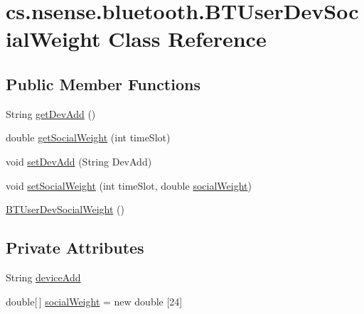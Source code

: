 \hypertarget{classcs_1_1nsense_1_1bluetooth_1_1_b_t_user_dev_social_weight}{\section{cs.\-nsense.\-bluetooth.\-B\-T\-User\-Dev\-Social\-Weight Class Reference}
\label{classcs_1_1nsense_1_1bluetooth_1_1_b_t_user_dev_social_weight}
}
\subsection*{Public Member Functions}
\begin{DoxyCompactItemize}
\item 
String \hyperlink{classcs_1_1nsense_1_1bluetooth_1_1_b_t_user_dev_social_weight_a4a86b07a5c005c4651f491f789ba6bd1}{get\-Dev\-Add} ()
\item 
double \hyperlink{classcs_1_1nsense_1_1bluetooth_1_1_b_t_user_dev_social_weight_af090ed06b103993fa00d23129dc3b3e6}{get\-Social\-Weight} (int time\-Slot)
\item 
void \hyperlink{classcs_1_1nsense_1_1bluetooth_1_1_b_t_user_dev_social_weight_a89039e52c09f831491cf3268581b85cd}{set\-Dev\-Add} (String Dev\-Add)
\item 
void \hyperlink{classcs_1_1nsense_1_1bluetooth_1_1_b_t_user_dev_social_weight_a93d76282e421d20b2726be35f88e8d1f}{set\-Social\-Weight} (int time\-Slot, double \hyperlink{classcs_1_1nsense_1_1bluetooth_1_1_bluetooth_core_1_1social_weight}{social\-Weight})
\item 
\hyperlink{classcs_1_1nsense_1_1bluetooth_1_1_b_t_user_dev_social_weight_aadf828ae7400620a7fb5d5829aad2f6c}{B\-T\-User\-Dev\-Social\-Weight} ()
\end{DoxyCompactItemize}
\subsection*{Private Attributes}
\begin{DoxyCompactItemize}
\item 
String \hyperlink{classcs_1_1nsense_1_1bluetooth_1_1_b_t_user_dev_social_weight_afae4e5e333da3b94d18bfd04fab5af6e}{device\-Add}
\item 
double\mbox{[}$\,$\mbox{]} \hyperlink{classcs_1_1nsense_1_1bluetooth_1_1_b_t_user_dev_social_weight_a7d8568ebbd7ef46a84f6a61d015b09e0}{social\-Weight} = new double \mbox{[}24\mbox{]}
\end{DoxyCompactItemize}


